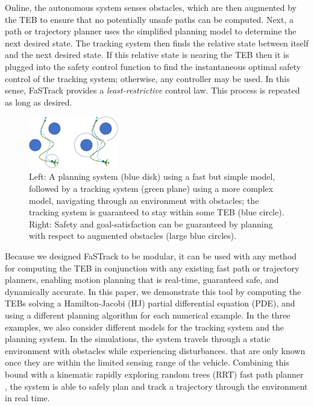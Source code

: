 Online, the autonomous system senses obstacles, which are then augmented by the TEB to ensure that no potentially unsafe paths can be computed. 
Next, a path or trajectory planner uses the simplified planning model to determine the next desired state. 
The tracking system then finds the relative state between itself and the next desired state. 
If this relative state is nearing the TEB then it is plugged into the safety control function to find the instantaneous optimal safety control of the tracking system; otherwise, any controller may be used. In this sense, FaSTrack provides a \emph{least-restrictive} control law. 
This process is repeated as long as desired. 
  
\begin{figure}
	\centering
	\includegraphics[width=0.35\textwidth]{fig/chasing}
	\caption{Left: A planning system (blue disk) using a fast but simple model, followed by a tracking system (green plane) using a more complex model, navigating through an environment with obstacles; the tracking system is guaranteed to stay within some TEB (blue circle). Right: Safety and goal-satisfaction can be guaranteed by planning with respect to augmented obstacles (large blue circles).}
	\label{fig:chasing}
\end{figure}
%

Because we designed FaSTrack to be modular, it can be used with any method for computing the TEB in conjunction with any existing fast path or trajectory planners, enabling motion planning that is real-time, guaranteed safe, and dynamically accurate. 
In this paper, we demonstrate this tool by computing the TEBs solving a Hamilton-Jacobi (HJ) partial differential equation (PDE), and using a different planning algorithm for each numerical example. 
In the three examples, we also consider different models for the tracking system and the planning system.
In the simulations, the system travels through a static environment with obstacles while experiencing disturbances.
 that are only known once they are within the limited sensing range of the vehicle. 
Combining this bound with a kinematic rapidly exploring random trees (RRT) fast path planner \cite{Kuffner2000,Kavraki1996}, the system is able to safely plan and track a trajectory through the environment in real time.